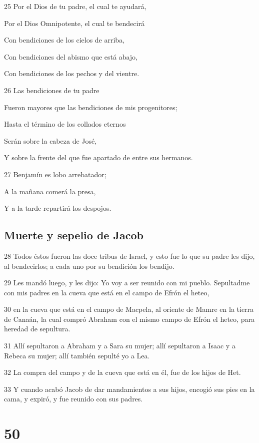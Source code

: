\par 25 Por el Dios de tu padre, el cual te ayudará,
\par Por el Dios Omnipotente, el cual te bendecirá
\par Con bendiciones de los cielos de arriba,
\par Con bendiciones del abismo que está abajo,
\par Con bendiciones de los pechos y del vientre.
\par 26 Las bendiciones de tu padre
\par Fueron mayores que las bendiciones de mis progenitores;
\par Hasta el término de los collados eternos
\par Serán sobre la cabeza de José,
\par Y sobre la frente del que fue apartado de entre sus hermanos.
\par 27 Benjamín es lobo arrebatador;
\par A la mañana comerá la presa,
\par Y a la tarde repartirá los despojos.

\section*{Muerte y sepelio de Jacob}

\par 28 Todos éstos fueron las doce tribus de Israel, y esto fue lo que su padre les dijo, al bendecirlos; a cada uno por su bendición los bendijo.
\par 29 Les mandó luego, y les dijo: Yo voy a ser reunido con mi pueblo. Sepultadme con mis padres en la cueva que está en el campo de Efrón el heteo,
\par 30 en la cueva que está en el campo de Macpela, al oriente de Mamre en la tierra de Canaán, la cual compró Abraham con el mismo campo de Efrón el heteo, para heredad de sepultura.
\par 31 Allí sepultaron a Abraham y a Sara su mujer; allí sepultaron a Isaac y a Rebeca su mujer; allí también sepulté yo a Lea.
\par 32 La compra del campo y de la cueva que está en él, fue de los hijos de Het.
\par 33 Y cuando acabó Jacob de dar mandamientos a sus hijos, encogió sus pies en la cama, y expiró, y fue reunido con sus padres.

\chapter{50}

